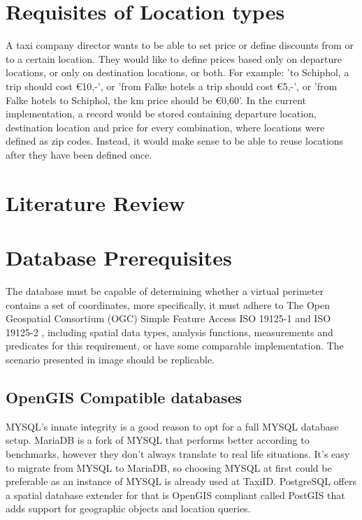 %
\section{Requisites of Location types}
A taxi company director wants to be able to set price or define discounts from or to a certain location. They would like to define prices based only on departure locations, or only on destination locations, or both. For example: 'to Schiphol, a trip should cost \euro 10,-', or 'from Falke hotels a trip should cost \euro 5,-', or 'from Falke hotels to Schiphol, the km price should be \euro 0,60'. In the current implementation, a record would be stored containing departure location, destination location and price for every combination, where locations were defined as zip codes. Instead, it would make sense to be able to reuse locations after they have been defined once.

%
\section{Literature Review}

%
\section{Database Prerequisites}
The database must be capable of determining whether a virtual perimeter contains a set of coordinates, more specifically, it must adhere to The Open Geospatial Consortium (OGC) Simple Feature Access ISO 19125-1  and ISO 19125-2 , including spatial data types, analysis functions, measurements and predicates for this requirement, or have some comparable implementation. The scenario presented in image  should be replicable.

\subsection{OpenGIS Compatible databases}
MYSQL’s innate integrity is a good reason to opt for a full MYSQL database setup. MariaDB is a fork of MYSQL that performs better according to benchmarks, however they don’t always translate to real life situations. It’s easy to migrate from MYSQL to MariaDB, so choosing MYSQL at first could be preferable as an instance of MYSQL is already used at TaxiID. PostgreSQL offers a spatial database extender for that is OpenGIS compliant called PostGIS that adds support for geographic objects and location queries.

